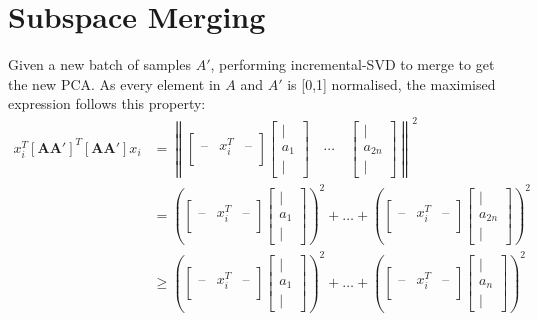 \section{Subspace Merging}
\label{sec:local-merge}
Given a new batch of samples $A'$, performing incremental-SVD to merge to get
the new PCA. As every element in $A$ and $A'$ is [0,1] normalised, the maximised
expression follows this property:
\begin{align}
x_i^T \mathbf{[AA']}^T \mathbf{[AA']} x_i &= \left\| \begin{bmatrix}
\text{--} & x_i^T & \text{--} \\
\end{bmatrix}
\begin{bmatrix}
| \\
a_1 \\
|
\end{bmatrix} \quad \cdots \quad
\begin{bmatrix}
| \\
a_{2n} \\
|
\end{bmatrix} \right\|^2 \\
&= \left( \begin{bmatrix}
\text{--} & x_i^T & \text{--} \\
\end{bmatrix}
\begin{bmatrix}
| \\
a_1 \\
|
\end{bmatrix} \right)^2 +  \dots + \left( \begin{bmatrix}
\text{--} & x_i^T & \text{--} \\
\end{bmatrix}
\begin{bmatrix}
| \\
a_{2n} \\
|
\end{bmatrix} \right)^2 \\
&\geq \left( \begin{bmatrix}
\text{--} & x_i^T & \text{--} \\
\end{bmatrix}
\begin{bmatrix}
| \\
a_1 \\
|
\end{bmatrix} \right)^2 + \dots + \left( \begin{bmatrix}
\text{--} & x_i^T & \text{--} \\
\end{bmatrix}
\begin{bmatrix}
| \\
a_{n} \\
|
\end{bmatrix} \right)^2
\end{align}

